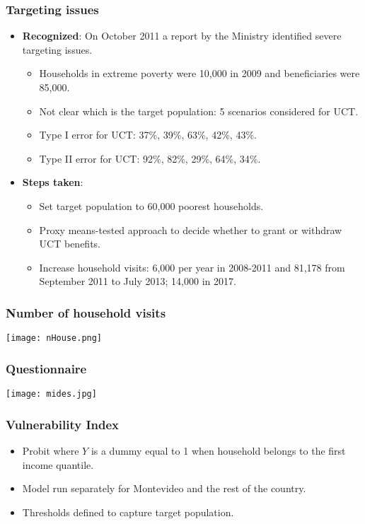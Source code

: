 \documentclass{beamer}
\begin{document}
\begin{frame}
\frametitle{Targeting issues}
		\begin{itemize}
			\item \textbf{Recognized}: On October 2011 a report by the Ministry identified severe targeting issues.
			\begin{itemize}
				\item Households in extreme poverty were 10,000 in 2009 and beneficiaries were 85,000.
				\item Not clear which is the target population: 5 scenarios considered for UCT.
				\item Type I error for UCT: 37\%, 39\%, 63\%, 42\%, 43\%.
				\item Type II error for UCT: 92\%, 82\%, 29\%, 64\%, 34\%.
			\end{itemize}
			\item \textbf{Steps taken}:
			\begin{itemize}
				\item Set target population to 60,000 poorest households.
				\item Proxy means-tested approach to decide whether to grant or withdraw UCT benefits.
				\item Increase household visits: 6,000 per year in 2008-2011 and 81,178 from September 2011 to July 2013; 14,000 in 2017.
			\end{itemize}	
		\end{itemize}
\end{frame}

\begin{frame}
\frametitle{Number of household visits}
\begin{center}
	\texttt{[image: nHouse.png]}
	\label{nHouse}
\end{center}
\end{frame}


\begin{frame}
\frametitle{Questionnaire}
\begin{center}
	\texttt{[image: mides.jpg]}
	\label{mides}
\end{center}
\end{frame}

\begin{frame}
\frametitle{Vulnerability Index}
\begin{itemize}
	\item Probit where $Y$ is a dummy equal to 1 when household belongs to the first income quantile.
	\item Model run separately for Montevideo and the rest of the country.
	\item Thresholds defined to capture target population.	
\end{itemize}
\end{frame}
\end{document}
